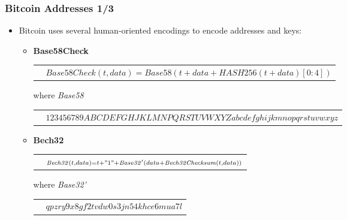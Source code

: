 \documentclass{beamer}
\begin{document}
\begin{frame}
  \frametitle{Bitcoin Addresses 1/3}
  \begin{itemize}
  \item Bitcoin uses several human-oriented encodings to encode addresses and
    keys:
    \begin{itemize}
    \item \textbf{Base58Check}
      \break
      \begin{tabular}{rl}
        &${\scriptstyle \mathit{Base58Check}(t, data) = \mathit{Base58}(t + data + \mathit{HASH256}(t + data)[0:4])}$ \\
      \end{tabular}
      \break
      where \textit{Base58}
      \break
      \begin{tabular}{rl}
        &${\scriptstyle 123456789ABCDEFGHJKLMNPQRSTUVWXYZabcdefghijkmnopqrstuvwxyz}$ \\
      \end{tabular}
    \item \textbf{Bech32}
      \break
      \begin{tabular}{rl}
        &${\scriptstyle \mathit{Bech32}(t, data) = t + "1" + \mathit{Base32'}(data +
          \mathit{Bech32Checksum}(t, data))}$ \\
      \end{tabular}
      where \textit{Base32'}
      \break
      \begin{tabular}{rl}
        &${\scriptstyle qpzry9x8gf2tvdw0s3jn54khce6mua7l}$ \\
      \end{tabular}
    \end{itemize}
  \end{itemize}
\end{frame}
\end{document}
